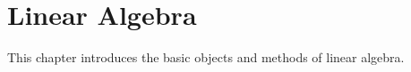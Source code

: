 \chapter{Linear Algebra}

This chapter introduces the basic objects and methods of linear algebra.




